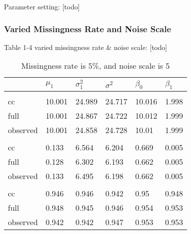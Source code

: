 \documentclass[
  twocolumn]{article}
\begin{document}
Parameter setting: {[}todo{]}

\hypertarget{varied-missingness-rate-and-noise-scale}{%
\subsubsection{Varied Missingness Rate and Noise
Scale}\label{varied-missingness-rate-and-noise-scale}}

Table 1-4 varied missingness rate \& noise scale: {[}todo{]}

\begin{table}[h]
\caption{Missingness rate is 5\%, and noise scale is 5}
\begingroup\fontsize{7}{9}\selectfont

\begin{tabu} to 
\toprule
 & $\mu_1$ & $\sigma^2_1$ & $\sigma^2$ & $\beta_0$ & $\beta_1$\\
\midrule
\addlinespace[0.3em]
\\
\hspace{1em}cc & 10.001 & 24.989 & 24.717 & 10.016 & 1.998\\
\hspace{1em}full & 10.001 & 24.867 & 24.722 & 10.012 & 1.999\\
\hspace{1em}observed & 10.001 & 24.858 & 24.728 & 10.01 & 1.999\\
\addlinespace[0.3em]
\\
\hspace{1em}cc & 0.133 & 6.564 & 6.204 & 0.669 & 0.005\\
\hspace{1em}full & 0.128 & 6.302 & 6.193 & 0.662 & 0.005\\
\hspace{1em}observed & 0.133 & 6.495 & 6.198 & 0.662 & 0.005\\
\addlinespace[0.3em]
\\
\hspace{1em}cc & 0.946 & 0.946 & 0.942 & 0.95 & 0.948\\
\hspace{1em}full & 0.948 & 0.945 & 0.946 & 0.954 & 0.953\\
\hspace{1em}observed & 0.942 & 0.942 & 0.947 & 0.953 & 0.953\\
\bottomrule
\end{tabu}
\endgroup{}
\end{table}
\end{document}
